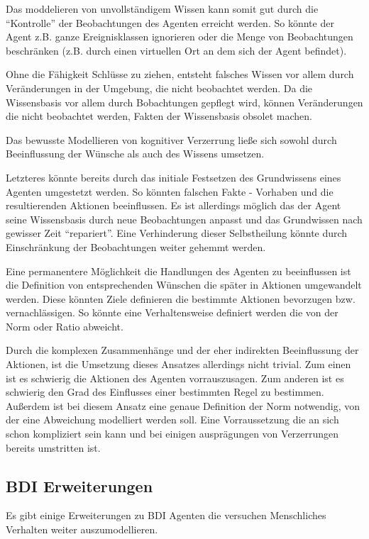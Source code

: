 Das moddelieren von unvollständigem Wissen kann somit gut durch die \enquote{Kontrolle} der Beobachtungen des Agenten erreicht werden. 
So könnte der Agent z.B. ganze Ereignisklassen ignorieren oder die Menge von Beobachtungen beschränken (z.B. durch einen virtuellen Ort an dem sich der Agent befindet).

Ohne die Fähigkeit Schlüsse zu ziehen, entsteht falsches Wissen vor allem durch Veränderungen in der Umgebung, die nicht beobachtet werden.
Da die Wissensbasis vor allem durch Bobachtungen gepflegt wird, können Veränderungen die nicht beobachtet werden, Fakten der Wissensbasis obsolet machen.

Das bewusste Modellieren von kognitiver Verzerrung ließe sich sowohl durch Beeinflussung der Wünsche als auch des Wissens umsetzen. 

Letzteres könnte bereits durch das initiale Festsetzen des Grundwissens eines Agenten umgestetzt werden. 
So könnten falschen Fakte - Vorhaben und die resultierenden Aktionen beeinflussen.
Es ist allerdings möglich das der Agent seine Wissensbasis durch neue Beobachtungen anpasst und das Grundwissen nach gewisser Zeit \enquote{repariert}.
Eine Verhinderung dieser Selbstheilung könnte durch Einschränkung der Beobachtungen weiter gehemmt werden.

Eine permanentere Möglichkeit die Handlungen des Agenten zu beeinflussen ist die Definition von entsprechenden Wünschen die später in Aktionen umgewandelt werden.
Diese könnten Ziele definieren die bestimmte Aktionen bevorzugen bzw. vernachlässigen.
So könnte eine Verhaltensweise definiert werden die von der Norm oder Ratio abweicht.

Durch die komplexen Zusammenhänge und der eher indirekten Beeinflussung der Aktionen, ist die Umsetzung dieses Ansatzes allerdings nicht trivial.
Zum einen ist es schwierig die Aktionen des Agenten vorrauszusagen.
Zum anderen ist es schwierig den Grad des Einflusses einer bestimmten Regel zu bestimmen.
Außerdem ist bei diesem Ansatz eine genaue Definition der Norm notwendig, von der eine Abweichung modelliert werden soll.
Eine Vorraussetzung die an sich schon kompliziert sein kann und bei einigen ausprägungen von Verzerrungen bereits umstritten ist.

\subsection{BDI Erweiterungen}
Es gibt einige Erweiterungen zu BDI Agenten die versuchen Menschliches Verhalten weiter auszumodellieren.

